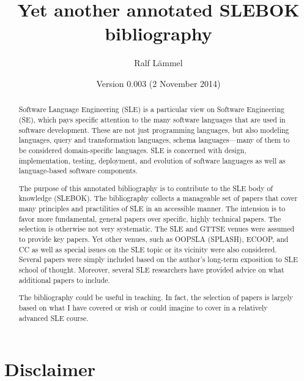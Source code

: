 \documentclass[12pt]{article}
\title{Yet another annotated SLEBOK bibliography}
\author{Ralf L\"ammel}
\date{Version 0.003 (2 November 2014)}
\begin{document}
\maketitle


\begin{abstract}

  Software Language Engineering (SLE) is a particular view on Software
  Engineering (SE), which pays specific attention to the many software
  languages that are used in software development. These are not just
  programming languages, but also modeling languages, query and
  transformation languages, schema languages---many of them to be
  considered domain-specific languages. SLE is concerned with design,
  implementation, testing, deployment, and evolution of software
  languages as well as language-based software components.

  \medskip

  The purpose of this annotated bibliography is to contribute to the
  SLE body of knowledge (SLEBOK). The bibliography collects a
  manageable set of papers that cover many principles and practilities
  of SLE in an accessible manner. The intension is to favor more
  fundamental, general papers over specific, highly technical papers.
  The selection is otherwise not very systematic. The SLE and GTTSE
  venues were assumed to provide key papers. Yet other venues, such as
  OOPSLA (SPLASH), ECOOP, and CC as well as special issues on the SLE
  topic or its vicinity were also considered. Several papers were
  simply included based on the author's long-term exposition to SLE
  school of thought. Moreover, several SLE researchers have provided
  advice on what additional papers to include.

  \medskip 

  The bibliography could be useful in teaching. In fact, the selection
  of papers is largely based on what I have covered or wish or could
  imagine to cover in a relatively advanced SLE course.

\end{abstract}


\newpage

\tableofcontents


\newpage

\section{Disclaimer}
\end{document}
